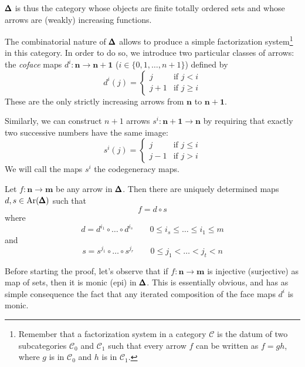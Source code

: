 \begin{refsection}
\begin{rmk}
$\pmb{\Delta}$ is thus the category whose objects are finite totally ordered sets and whose arrows are (weakly) increasing functions.
\end{rmk}

The combinatorial nature of $\pmb{\Delta}$ allows to produce a simple factorization system\footnote{Remember that a factorization system in a category $\mathcal C$ is the datum of two subcategories $\mathcal C_0$ and $\mathcal C_1$ such that every arrow $f$ can be written as $f = gh$, where $g$ is in $\mathcal C_0$ and $h$ is in $\mathcal C_1$.} in this category. In order to do so, we introduce two particular classes of arrows: the \emph{coface} maps $d^i \colon \mathbf n \to \mathbf{n+1}$ ($i \in \{0,1,\ldots,n+1\}$) defined by
\[
d^i(j) = \begin{cases} j & \text{if } j < i \\ j + 1 & \text{if } j \ge i \end{cases}
\]
These are the only strictly increasing arrows from $\mathbf n$ to $\mathbf{n+1}$.

Similarly, we can construct $n+1$ arrows $s^i \colon \mathbf{n+1} \to \mathbf n$ by requiring that exactly two successive numbers have the same image:
\[
s^i(j) = \begin{cases} j & \text{if } j \le i \\ j - 1 & \text{if } j > i \end{cases}
\]
We will call the maps $s^i$ the codegeneracy maps.

\begin{thm} \label{thm factorization epi-mono for Delta}
Let $f \colon \mathbf n \to \mathbf m$ be any arrow in $\pmb{\Delta}$. Then there are uniquely determined maps $d,s \in \mathrm{Ar}(\pmb{\Delta})$ such that
\[
f = d \circ s
\]
where
\begin{equation} \label{eq increasing part}
d = d^{i_1} \circ \ldots \circ d^{i_s} \qquad 0 \le i_s \le \ldots \le i_1 \le m
\end{equation}
and
\begin{equation} \label{eq decreasing part}
s = s^{j_1} \circ \ldots \circ s^{j_r} \qquad 0 \le j_1 < \ldots < j_t < n
\end{equation}
\end{thm}

\begin{rmk}
Before starting the proof, let's observe that if $f \colon \mathbf n \to \mathbf m$ is injective (surjective) as map of sets, then it is monic (epi) in $\pmb{\Delta}$. This is essentially obvious, and has as simple consequence the fact that any iterated composition of the face maps $d^i$ is monic.
\end{rmk}


\end{refsection}
